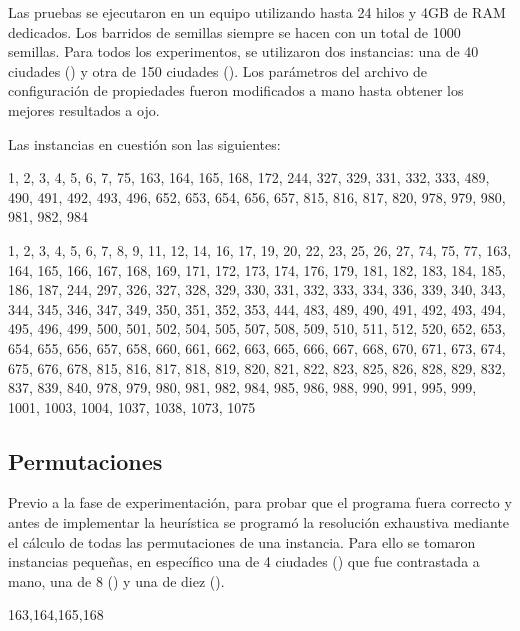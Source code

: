 \documentclass[9pt,a4paper,twocolumn,twoside]{tau-class/tau}
\begin{document}
Las pruebas se ejecutaron en un equipo utilizando hasta 24 hilos y 4GB de RAM dedicados. Los barridos de semillas siempre se hacen con un total de 1000 semillas. Para todos los experimentos, se utilizaron dos instancias: una de 40 ciudades () y otra de 150 ciudades (). Los parámetros del archivo de configuración de propiedades fueron modificados a mano hasta obtener los mejores resultados a ojo.

Las instancias en cuestión son las siguientes:

\begin{tauenv}[frametitle=input-40.tsp]
    \small\ttfamily\raggedright
    1, 2, 3, 4, 5, 6, 7, 75, 163, 164, 165, 168, 172, 244, 327, 329, 331, 332, 333, 489, 490, 491, 492, 493, 496, 652, 653, 654, 656, 657, 815, 816, 817, 820, 978, 979, 980, 981, 982, 984
\end{tauenv}

\begin{tauenv}[frametitle=input-150.tsp]
    \small\ttfamily\raggedright
    1, 2, 3, 4, 5, 6, 7, 8, 9, 11, 12, 14, 16, 17, 19, 20, 22, 23, 25, 26, 27, 74, 75, 77, 163, 164, 165, 166, 167, 168, 169, 171, 172, 173, 174, 176, 179, 181, 182, 183, 184, 185, 186, 187, 244, 297, 326, 327, 328, 329, 330, 331, 332, 333, 334, 336, 339, 340, 343, 344, 345, 346, 347, 349, 350, 351, 352, 353, 444, 483, 489, 490, 491, 492, 493, 494, 495, 496, 499, 500, 501, 502, 504, 505, 507, 508, 509, 510, 511, 512, 520, 652, 653, 654, 655, 656, 657, 658, 660, 661, 662, 663, 665, 666, 667, 668, 670, 671, 673, 674, 675, 676, 678, 815, 816, 817, 818, 819, 820, 821, 822, 823, 825, 826, 828, 829, 832, 837, 839, 840, 978, 979, 980, 981, 982, 984, 985, 986, 988, 990, 991, 995, 999, 1001, 1003, 1004, 1037, 1038, 1073, 1075
\end{tauenv}

\subsection{Permutaciones}
Previo a la fase de experimentaci\'on, para probar que el programa fuera correcto y antes de implementar la heurística se programó la resolución exhaustiva mediante el cálculo de todas las permutaciones de una instancia. Para ello se tomaron instancias pequeñas, en específico una de 4 ciudades () que fue contrastada a mano, una de 8 () y una de diez ().

\begin{tauenv}[frametitle=input-4.tsp]
    \small\ttfamily\raggedright
    163,164,165,168
\end{tauenv}
\end{document}
